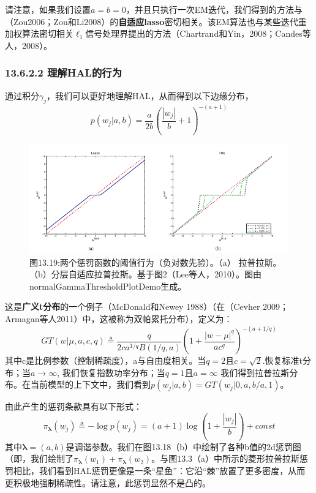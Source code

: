 \documentclass[a4paper]{article}
\begin{document}
请注意，如果我们设置$a=b=0$，并且只执行一次EM迭代，我们得到的方法与（Zou2006；Zou和Li2008）的\textbf{自适应lasso}密切相关。该EM算法也与某些迭代重加权算法密切相关$\ell_1$信号处理界提出的方法（Chartrand和Yin，2008；Candes等人，2008）。

\subsubsection*{13.6.2.2 理解HAL的行为}
通过积分$\gamma_j$，我们可以更好地理解HAL，从而得到以下边缘分布，
\begin{equation}
	p(w_j|a,b)=\frac{a}{2b}\left(\frac{|w_j|}{b}+1\right)^{-(a+1)}\tag{13.141}
\end{equation}
\begin{figure}[h]
	\centering
	\includegraphics[width=0.7\linewidth]{fig13/figure19}
	\caption*{图13.19:两个惩罚函数的阈值行为（负对数先验）。（a） 拉普拉斯。（b）分层自适应拉普拉斯。基于图2（Lee等人，2010）。图由normalGammaThresholdPlotDemo生成。}
\end{figure}

这是\textbf{广义t分布}的一个例子（McDonald和Newey 1988）（在（Cevher 2009；Armagan等人2011）中，这被称为双帕累托分布），定义为：
\begin{equation}
	GT(w|\mu,a,c,q)\triangleq \dfrac{q}{2ca^{1/q}B(1/q,a)}\left(1+\frac{|w-\mu|^q}{ac^q}\right)^{-(a+1/q)}\tag{13.142}
\end{equation}
其中c是比例参数（控制稀疏度），a与自由度相关。当$q=2$且$c=\sqrt{2}$.恢复标准t分布；当$a\to \infty$, 我们恢复指数功率分布；当$q=1$且$a=\infty$ 我们得到拉普拉斯分布。在当前模型的上下文中，我们看到$p(w_j|a,b)=GT(w_j|0,a,b/a,1)$。

由此产生的惩罚条款具有以下形式：
\begin{equation}
	\pi_{\boldsymbol{\lambda}}(w_j)\triangleq -\log p(w_j)=(a+1)\log (1+\frac{|w_j|}{b})+const\tag{13.143}
\end{equation}
其中$\boldsymbol{\lambda}=(a,b)$是调谐参数。我们在图13.18（b）中绘制了各种b值的2d惩罚图（即，我们绘制了$\pi_{\boldsymbol{\lambda}}(w_1)+\pi_{\boldsymbol{\lambda}}(w_2)$。与图13.3（a）中所示的菱形拉普拉斯惩罚相比，我们看到HAL惩罚更像是一条“星鱼”：它沿“棘”放置了更多密度，从而更积极地强制稀疏性。请注意，此惩罚显然不是凸的。
\end{document}
